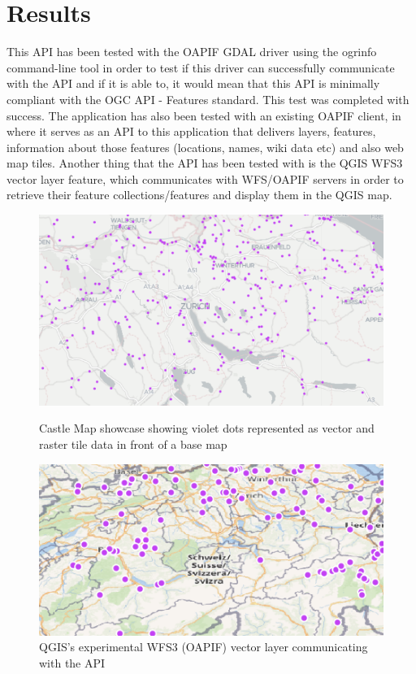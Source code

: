 \section*{Results}
This API has been tested with the OAPIF GDAL driver using the ogrinfo
command-line tool in order to test if this driver can successfully communicate with the API and if it is able to, it would mean that this API is minimally compliant with the OGC API - Features standard. This test was completed with success. The application has also been tested with an existing OAPIF client, in where it serves as an API to this application that delivers layers, features, information about those features (locations, names, wiki data etc) and also web map tiles. Another thing that the API has been tested with is the QGIS WFS3 vector layer feature, which communicates with WFS/OAPIF servers in order to retrieve their feature collections/features and display them in the QGIS map.
\begin{figure}[!htb]
	\centering
	\begin{minipage}[b]{0.48\textwidth}
		\includegraphics[width=\textwidth]{./Images/ManagementSummary/zurich_tiles.png}
		\caption{Castle Map showcase showing violet dots represented as vector and raster tile data in front of a base map}
	\end{minipage}
	\hfill
	\begin{minipage}[b]{0.48\textwidth}
		\includegraphics[width=\textwidth]{./Images/ManagementSummary/qgis_wfs3.png}
		\caption{QGIS's experimental WFS3 (OAPIF) vector layer communicating with the API}
	\end{minipage}
\end{figure}
\newpage
